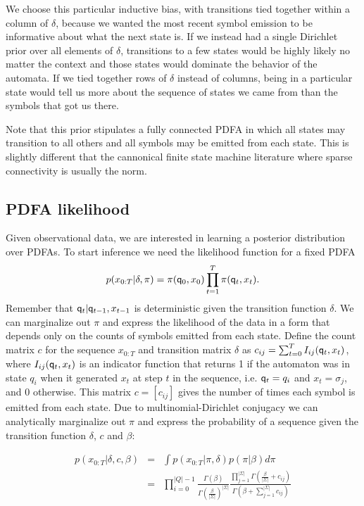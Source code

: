 %
We choose this particular inductive bias, with transitions tied together within a column of $\delta$, because we wanted the most recent symbol emission to be informative about what the next state is.  If we instead had a single Dirichlet prior over all elements of $\delta$, transitions to a few states would be highly likely no matter the context and those states would dominate the behavior of the automata.  If we tied together rows of $\delta$ instead of columns, being in a particular state would tell us more about the sequence of states we came from than the symbols that got us there.  

 Note that this prior stipulates a fully connected PDFA in which all states may transition to all others and all symbols may be emitted from each state.  This is slightly different that the cannonical finite state machine literature where sparse connectivity is usually the norm.

\subsection{PDFA likelihood}

Given observational data, we are interested in learning a posterior distribution over PDFAs.  To start inference we need the likelihood function for a fixed PDFA
%
\[ p(x_{0:T}|\delta,\pi) = \pi(\q_0,x_0)\prod_{t=1}^T \pi(\q_t,x_t) \label{x:def}. \]
%
Remember that $\q_t | \q_{t-1}, x_{t-1}$ is deterministic given the transition function $\delta$. 
We can marginalize out $\pi$ and express the likelihood of the data in a form that depends only on the counts of symbols emitted from each state.  Define the count matrix $c$ for the sequence $x_{0:T}$ and transition matrix $\delta$ as $c_{ij} = \sum_{t=0}^T I_{ij}(\q_t,x_t)$, where $I_{ij}(\q_t,x_t)$ is an indicator function that returns 1 if the automaton was in state $q_i$ when it generated $x_t$ at step $t$ in the sequence, i.e. $\q_t = q_i$ and $x_t = \sigma_j$, and 0 otherwise. This matrix $c = [c_{ij}]$ gives the number of times each symbol is emitted from each state.  Due to multinomial-Dirichlet conjugacy we can analytically marginalize out $\pi$ and express the probability of a sequence given the transition function $\delta$, $c$ and $\beta$:

\begin{eqnarray}
 p(x_{0:T}|\delta,c,\beta) & = & \int p(x_{0:T}|\pi,\delta) p(\pi|\beta) d\pi \label{x:factor} \\
 & = & \prod_{i=0}^{|Q|-1} \frac{\Gamma(\beta)}{\Gamma(\frac{\beta}{|\Sigma|})^{|\Sigma|}} \frac{\prod_{j=1}^{|\Sigma|}\Gamma(\frac{\beta}{|\Sigma|} + c_{ij})}{\Gamma(\beta + \sum_{j=1}^{|\Sigma|} c_{ij})} \label{x:end}
 \end{eqnarray}
 
